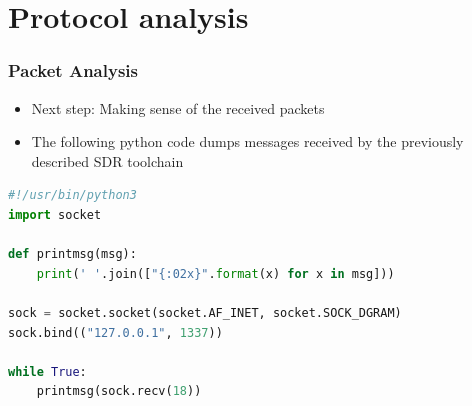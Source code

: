 \documentclass[aspectratio=169]{beamer}
\begin{document}
\section{Protocol analysis}
\begin{frame}[fragile]
	\frametitle{Packet Analysis}

	\begin{itemize}
		\item Next step: Making sense of the received packets
		\item The following python code dumps messages received by the previously described SDR toolchain
	\end{itemize}

\begin{scriptsize}
\begin{lstlisting}[frame=single,showstringspaces=false,language=Python,commentstyle=\color{commentsColor}\textit,keywordstyle=\color{keywordsColor}\bfseries,stringstyle=\color{stringColor}]
#!/usr/bin/python3
import socket

def printmsg(msg):
    print(' '.join(["{:02x}".format(x) for x in msg]))

sock = socket.socket(socket.AF_INET, socket.SOCK_DGRAM)
sock.bind(("127.0.0.1", 1337))

while True:
    printmsg(sock.recv(18))
\end{lstlisting}
\end{scriptsize}
\end{frame}
\end{document}
